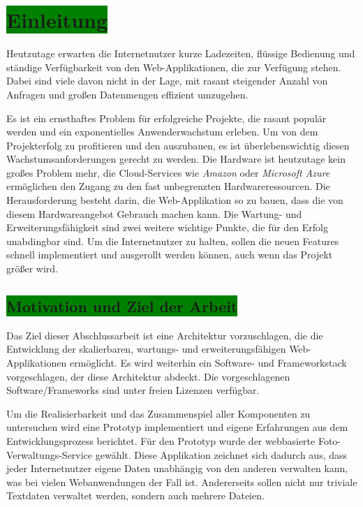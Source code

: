 \chapter{\colorbox{green}{Einleitung}}

Heutzutage erwarten die Internetnutzer kurze Ladezeiten, flüssige Bedienung und ständige Verfügbarkeit von den Web-Applikationen, die zur Verfügung stehen. Dabei sind viele davon nicht in der Lage, mit rasant steigender Anzahl von Anfragen und großen Datenmengen effizient umzugehen.

Es ist ein ernsthaftes Problem für erfolgreiche Projekte, die rasant populär werden und ein exponentielles Anwenderwachstum erleben. Um von dem Projekterfolg zu profitieren und den auszubauen, es ist überlebenswichtig diesen Wachstumsanforderungen gerecht zu werden. Die Hardware ist heutzutage kein großes Problem mehr, die  Cloud-Services wie \textit{Amazon} oder \textit{Microsoft Azure} ermöglichen den Zugang zu den fast unbegrenzten Hardwareressourcen. Die Herausforderung besteht darin, die Web-Applikation so zu bauen, dass die von diesem Hardwareangebot Gebrauch machen kann. Die Wartung- und Erweiterungsfähigkeit sind zwei weitere wichtige Punkte, die für den Erfolg unabdingbar sind. Um die Internetnutzer zu halten, sollen die neuen Features schnell implementiert und ausgerollt werden können, auch wenn das Projekt größer wird.

\section{\colorbox{green}{Motivation und Ziel der Arbeit}}

Das Ziel dieser Abschlussarbeit ist eine Architektur vorzuschlagen, die die Entwicklung der skalierbaren,  wartungs- und erweiterungsfähigen Web-Applikationen ermöglicht. Es wird weiterhin ein Software-  und Frameworkstack vorgeschlagen, der diese Architektur abdeckt. Die vorgeschlagenen Software/Frameworks sind unter freien Lizenzen verfügbar.

Um die Realisierbarkeit und das Zusammenspiel aller Komponenten zu untersuchen wird eine Prototyp implementiert und eigene Erfahrungen aus dem Entwicklungsprozess berichtet. Für den Prototyp wurde der webbasierte Foto-Verwaltungs-Service gewählt. Diese Applikation zeichnet sich dadurch aus, dass jeder Internetnutzer eigene Daten unabhängig von den anderen verwalten kann, was bei vielen Webanwendungen der Fall ist. Andererseits sollen nicht nur triviale Textdaten verwaltet werden, sondern auch mehrere Dateien.

